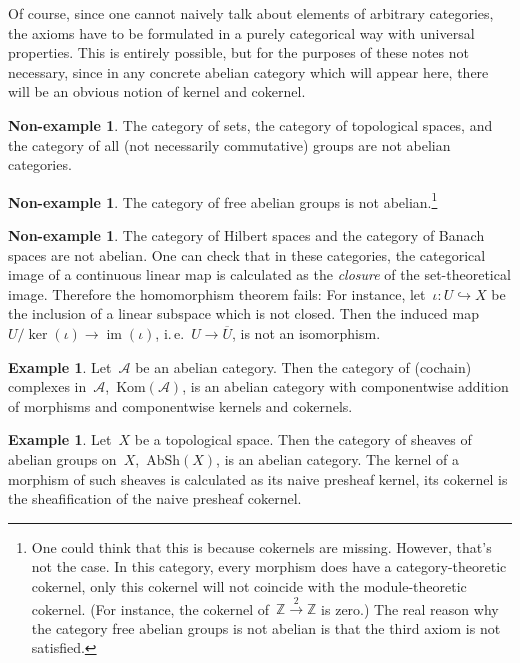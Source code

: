 \documentclass{amsart}
\makeatletter
\theoremstyle{definition}
\newtheorem{ex}[defn]{Example}
\newtheorem{non-ex}[defn]{Non-example}
\theoremstyle{plain}
\theoremstyle{remark}
\newcommand{\ZZ}{\mathbb{Z}}
\newcommand{\A}{\mathcal{A}}
\newcommand{\Kom}{\mathrm{Kom}}
\newcommand{\AbSh}{\mathrm{AbSh}}
\DeclareMathOperator{\Image}{im}
\DeclareMathOperator{\Kernel}{ker}
\newcommand{\?}{\,{:}\,}
\renewcommand{\_}{\mathpunct{.}\,}
\newcommand{\ie}{i.\,e.\@\xspace}
\makeatother
\begin{document}
Of course, since one cannot naively talk about elements of arbitrary
categories, the axioms have to be formulated in a purely categorical way with
universal properties. This is entirely possible, but for the purposes of these
notes not necessary, since in any concrete abelian category which will appear here,
there will be an obvious notion of kernel and cokernel.

\begin{non-ex}The category of sets, the category of topological spaces, and the
category of all (not necessarily commutative) groups are not abelian
categories.\end{non-ex}

\begin{non-ex}The category of free abelian groups is not abelian.\footnote{One
could think that this is because cokernels are missing. However, that's not the
case. In this category, every morphism does have a category-theoretic
cokernel, only this cokernel will not coincide with the module-theoretic
cokernel. (For instance, the cokernel of~$\ZZ \stackrel{2}{\to} \ZZ$ is zero.) The real
reason why the category free abelian groups is not abelian is that the third
axiom is not satisfied.}\end{non-ex}

\begin{non-ex}The category of Hilbert spaces and the category of Banach spaces
are not abelian. One can check that in these categories, the categorical image
of a continuous linear map is calculated as the \emph{closure} of the
set-theoretical image. Therefore the homomorphism theorem fails: For instance,
let~$\iota : U \hookrightarrow X$ be the inclusion of a linear subspace which is
not closed. Then the induced map~$U/\Kernel(\iota) \to \Image(\iota)$, \ie~$U
\to \overline{U}$, is not an isomorphism.
\end{non-ex}

\begin{ex}Let~$\A$ be an abelian category. Then the category of (cochain)
complexes in~$\A$,~$\Kom(\A)$, is an abelian category with componentwise
addition of morphisms and componentwise kernels and cokernels.\end{ex}

\begin{ex}Let~$X$ be a topological space. Then the category of sheaves of
abelian groups on~$X$,~$\AbSh(X)$, is an abelian category. The kernel of a
morphism of such sheaves is calculated as its naive presheaf kernel, its
cokernel is the sheafification of the naive presheaf cokernel.\end{ex}
\end{document}
